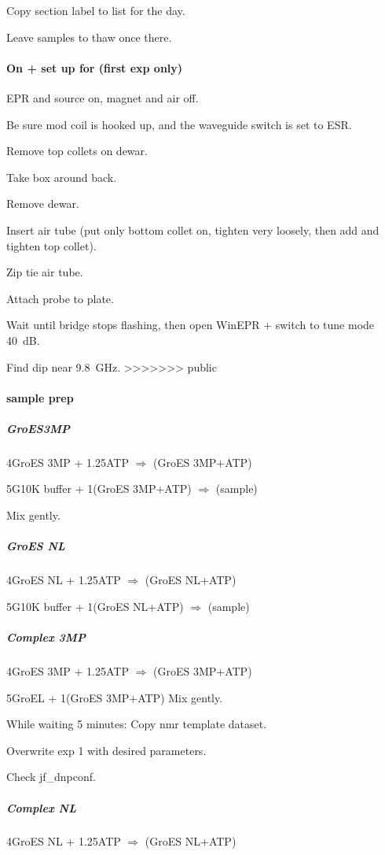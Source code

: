 Copy section label to list for the day.

Leave samples to thaw once there.

\paragraph{On + set up for (first exp only)}

EPR and source on, magnet and air off.

Be sure mod coil is hooked up, and the waveguide switch is set to ESR.

Remove top collets on dewar.

Take box around back.

Remove dewar.

Insert air tube (put only bottom collet on, tighten very loosely, then add and tighten top collet).

Zip tie air tube.

Attach probe to plate.

Wait until bridge stops flashing, then open WinEPR + switch to tune mode 40~dB.

Find dip near 9.8~GHz.
>>>>>>> public

\paragraph{sample prep}
\subparagraph{GroES3MP}
4\uL GroES 3MP + 1.25\M ATP $\Rightarrow$ (GroES 3MP+ATP)

5\uL G10K buffer + 1\uL (GroES 3MP+ATP) $\Rightarrow$ (sample)

Mix gently.

\subparagraph{GroES NL}
4\uL GroES NL + 1.25\M ATP $\Rightarrow$ (GroES NL+ATP)

5\uL G10K buffer + 1\uL (GroES NL+ATP) $\Rightarrow$ (sample)

\subparagraph{Complex 3MP}
4\uL GroES 3MP + 1.25\M ATP $\Rightarrow$ (GroES 3MP+ATP)

5\uL GroEL + 1\uL (GroES 3MP+ATP)
Mix gently.

While waiting 5 minutes:
Copy nmr template dataset.

Overwrite exp 1 with desired parameters.

Check jf\_dnpconf.

\subparagraph{Complex NL}
4\uL GroES NL + 1.25\M ATP $\Rightarrow$ (GroES NL+ATP)

